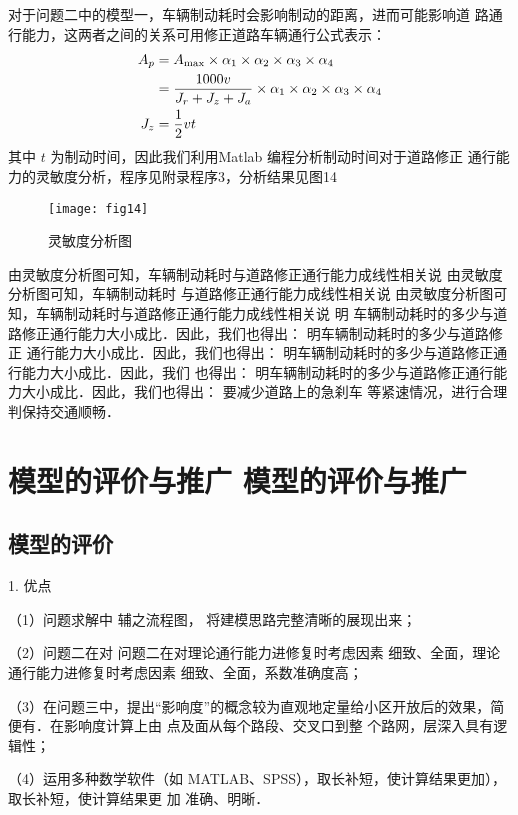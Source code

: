 对于问题二中的模型一，车辆制动耗时会影响制动的距离，进而可能影响道
路通行能力，这两者之间的关系可用修正道路车辆通行公式表示：
\begin{align}
A_{p}&=A_{\max} \times \alpha_{1} \times \alpha_{2} \times \alpha_{3} \times \alpha_{4}\notag\\
&=\dfrac{1000 v}{J_{r}+J_{z}+J_{a}} \times \alpha_{1} \times \alpha_{2} \times \alpha_{3} \times \alpha_{4} \\
J_{z}&=\dfrac{1}{2} v t
\end{align}
其中 $t$ 为制动时间，因此我们利用Matlab 编程分析制动时间对于道路修正
通行能力的灵敏度分析，程序见附录程序3，分析结果见图14

\begin{figure}
  \centering
  \texttt{[image: fig14]}
  \caption{灵敏度分析图}
\end{figure}

由灵敏度分析图可知，车辆制动耗时与道路修正通行能力成线性相关说 由灵敏度分析图可知，车辆制动耗时
与道路修正通行能力成线性相关说 由灵敏度分析图可知，车辆制动耗时与道路修正通行能力成线性相关说 明
车辆制动耗时的多少与道路修正通行能力大小成比．因此，我们也得出： 明车辆制动耗时的多少与道路修正
通行能力大小成比．因此，我们也得出： 明车辆制动耗时的多少与道路修正通行能力大小成比．因此，我们
也得出： 明车辆制动耗时的多少与道路修正通行能力大小成比．因此，我们也得出： 要减少道路上的急刹车
等紧速情况，进行合理判保持交通顺畅．


\section{模型的评价与推广 模型的评价与推广}

\subsection{模型的评价}

1. 优点

（1）问题求解中 辅之流程图， 将建模思路完整清晰的展现出来；

（2）问题二在对 问题二在对理论通行能力进修复时考虑因素 细致、全面，理论通行能力进修复时考虑因素
 细致、全面，系数准确度高；

（3）在问题三中，提出“影响度”的概念较为直观地定量给小区开放后的效果，简便有．在影响度计算上由
点及面从每个路段、交叉口到整 个路网，层深入具有逻辑性；

（4）运用多种数学软件（如 MATLAB、SPSS），取长补短，使计算结果更加），取长补短，使计算结果更
加 准确、明晰．

